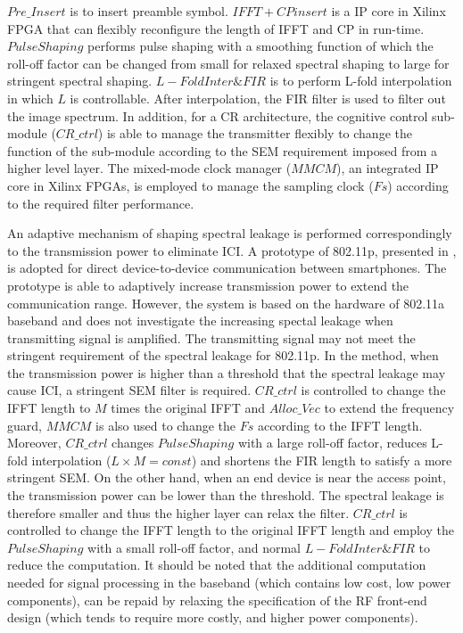 $\mathit{Pre\_Insert}$ is to insert preamble symbol. 
$\mathit{IFFT+CP insert}$ is a IP core in Xilinx FPGA that can flexibly reconfigure the length of IFFT and CP in run-time.
$\mathit{PulseShaping}$ performs pulse shaping with a smoothing function of which the roll-off factor can be changed from small for relaxed spectral shaping to large for stringent spectral shaping.
$\mathit{L-Fold Inter\&FIR}$ is to perform L-fold interpolation in which $L$ is controllable. After interpolation, the FIR filter is used to filter out the image spectrum. 
In addition, for a CR architecture, the cognitive control sub-module ($\mathit{CR\_ctrl}$) is able to manage the transmitter flexibly to change the function of the sub-module according to the SEM requirement imposed from a higher level layer.
The mixed-mode clock manager ($\mathit{MMCM}$), an integrated IP core in Xilinx FPGAs, is employed to manage the sampling clock ($\mathit{Fs}$) according to the required filter performance.

An adaptive mechanism of shaping spectral leakage is performed correspondingly to the transmission power to eliminate ICI.
A prototype of 802.11p, presented in \cite{Choi2014}, is adopted for direct device-to-device communication between smartphones.
The prototype is able to adaptively increase transmission power to extend the communication range.
However, the system is based on the hardware of 802.11a baseband and does not investigate the increasing spectal leakage when transmitting signal is amplified.
The transmitting signal may not meet the stringent requirement of the spectral leakage for 802.11p.
In the method, when the transmission power is higher than a threshold that the spectral leakage may cause ICI, a stringent SEM filter is required.
$\mathit{CR\_ctrl}$ is controlled to change the IFFT length to $M$ times the original IFFT and $\mathit{Alloc\_Vec}$ to extend the frequency guard, $\mathit{MMCM}$ is also used to change the $\mathit{Fs}$ according to the IFFT length.
Moreover, $\mathit{CR\_ctrl}$ changes $\mathit{PulseShaping}$ with a large roll-off factor, reduces L-fold interpolation ($L\times M = const$) and shortens the FIR length to satisfy a more stringent SEM.
On the other hand, when an end device is near the access point, the transmission power can be lower than the threshold. The spectral leakage is therefore smaller and thus the higher layer can relax the filter. 
$\mathit{CR\_ctrl}$ is controlled to change the IFFT length to the original IFFT length and employ the $\mathit{PulseShaping}$ with a small roll-off factor, and normal $\mathit{L-Fold Inter\&FIR}$ to reduce the computation.
It should be noted that the additional computation needed for signal processing in the baseband (which contains low cost, low power components), can be repaid by relaxing the specification of the RF front-end design (which tends to require more costly, and higher power components).

